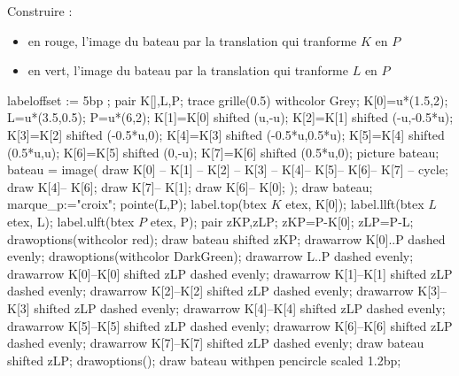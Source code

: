 \begin{corrige}
    Construire :
    \begin{itemize}
        \item en rouge, l'image du bateau par la translation qui tranforme $K$ en $P$
        \item en vert, l'image du bateau par la translation qui tranforme $L$ en $P$
    \end{itemize}
    \smallskip
    \begin{Geometrie}[CoinHD={(8u,4u)}]
        labeloffset := 5bp ;
        pair K[],L,P;                    
        trace grille(0.5) withcolor Grey;
        K[0]=u*(1.5,2);
        L=u*(3.5,0.5);
        P=u*(6,2);
        K[1]=K[0] shifted (u,-u);
        K[2]=K[1] shifted (-u,-0.5*u);
        K[3]=K[2] shifted (-0.5*u,0);
        K[4]=K[3] shifted (-0.5*u,0.5*u);
        K[5]=K[4] shifted (0.5*u,u);
        K[6]=K[5] shifted (0,-u);
        K[7]=K[6] shifted (0.5*u,0);
        picture bateau;
        bateau = image( 
            draw K[0] -- K[1] -- K[2] -- K[3] -- K[4]-- K[5]-- K[6]-- K[7] -- cycle;
            draw K[4]-- K[6];
            draw K[7]-- K[1];
            draw K[6]-- K[0];
        );
        draw bateau;
        marque_p:="croix";
        pointe(L,P);
        label.top(btex $K$ etex, K[0]);
        label.llft(btex $L$ etex, L);
        label.ulft(btex $P$ etex, P);
        pair zKP,zLP;
        zKP=P-K[0];
        zLP=P-L;
        drawoptions(withcolor red);
        draw bateau shifted zKP;
        drawarrow K[0]..P dashed evenly;
        drawoptions(withcolor DarkGreen);
        drawarrow L..P dashed evenly;
        drawarrow K[0]--K[0] shifted zLP dashed evenly;
        drawarrow K[1]--K[1] shifted zLP dashed evenly;
        drawarrow K[2]--K[2] shifted zLP dashed evenly;
        drawarrow K[3]--K[3] shifted zLP dashed evenly;
        drawarrow K[4]--K[4] shifted zLP dashed evenly;
        drawarrow K[5]--K[5] shifted zLP dashed evenly;
        drawarrow K[6]--K[6] shifted zLP dashed evenly;
        drawarrow K[7]--K[7] shifted zLP dashed evenly;
        draw bateau shifted zLP;
        drawoptions();
        draw bateau withpen pencircle scaled 1.2bp;
    \end{Geometrie}
\end{corrige}

